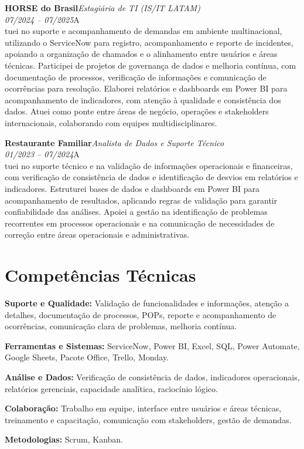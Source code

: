 \documentclass[11pt,a4paper]{article}
\newcommand{\cvrole}[4]{%
  \vspace{4pt}%
  {\bfseries\color{accentcolor}#1}\hfill{\itshape #2}\\[-2pt]%
  {\itshape #3}\hfill #4\\[6pt]%
}
\begin{document}
\cvrole{HORSE do Brasil}{Estagiária de TI (IS/IT LATAM)}{07/2024 -- 07/2025}

Atuei no suporte e acompanhamento de demandas em ambiente multinacional, utilizando o ServiceNow para registro, acompanhamento e reporte de incidentes, apoiando a organização de chamados e o alinhamento entre usuários e áreas técnicas. Participei de projetos de governança de dados e melhoria contínua, com documentação de processos, verificação de informações e comunicação de ocorrências para resolução. Elaborei relatórios e dashboards em Power BI para acompanhamento de indicadores, com atenção à qualidade e consistência dos dados. Atuei como ponte entre áreas de negócio, operações e stakeholders internacionais, colaborando com equipes multidisciplinares.

\cvrole{Restaurante Familiar}{Analista de Dados e Suporte Técnico}{01/2023 -- 07/2024}

Atuei no suporte técnico e na validação de informações operacionais e financeiras, com verificação de consistência de dados e identificação de desvios em relatórios e indicadores. Estruturei bases de dados e dashboards em Power BI para acompanhamento de resultados, aplicando regras de validação para garantir confiabilidade das análises. Apoiei a gestão na identificação de problemas recorrentes em processos operacionais e na comunicação de necessidades de correção entre áreas operacionais e administrativas.

\section{Competências Técnicas}

\textbf{Suporte e Qualidade:} Validação de funcionalidades e informações, atenção a detalhes, documentação de processos, POPs, reporte e acompanhamento de ocorrências, comunicação clara de problemas, melhoria contínua.

\textbf{Ferramentas e Sistemas:} ServiceNow, Power BI, Excel, SQL, Power Automate, Google Sheets, Pacote Office, Trello, Monday.

\textbf{Análise e Dados:} Verificação de consistência de dados, indicadores operacionais, relatórios gerenciais, capacidade analítica, raciocínio lógico.

\textbf{Colaboração:} Trabalho em equipe, interface entre usuários e áreas técnicas, treinamento e capacitação, comunicação com stakeholders, gestão de demandas.

\textbf{Metodologias:} Scrum, Kanban.
\end{document}
